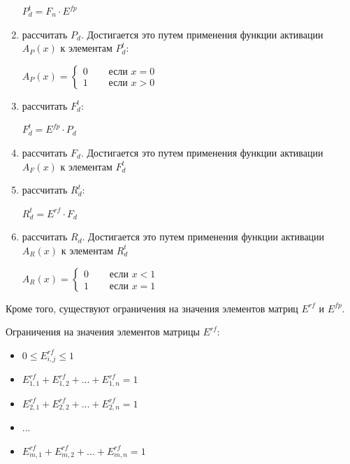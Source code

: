 \documentclass{article}
\begin{document}
\begin{enumerate}
    \begin{center}
      $P^{t}_{d} = F_{n} \cdot E^{fp}$
    \end{center}

    \item рассчитать $P_{d}$. Достигается это путем применения функции активации $A_{P}(x)$ к элементам $P^{t}_{d}$:

    \begin{center}
      $
      A_{P}(x) =
        \begin{cases}
          0 & \quad \text{ если } x = 0 \\
          1 & \quad \text{ если } x > 0
        \end{cases}
      $
    \end{center}

    \item рассчитать $F^{t}_{d}$:

    \begin{center}
      $F^{t}_{d} = E^{fp} \cdot P_{d}$
    \end{center}

    \item рассчитать $F_{d}$. Достигается это путем применения функции активации $A_{F}(x)$ к элементам $F^{t}_{d}$

    \item рассчитать $R^{t}_{d}$:

    \begin{center}
      $R^{t}_{d} = E^{rf} \cdot F_{d}$
    \end{center}

    \item рассчитать $R_{d}$. Достигается это путем применения функции активации $A_{R}(x)$ к элементам $R^{t}_{d}$

    \begin{center}
      $
      A_{R}(x) =
        \begin{cases}
          0 & \quad \text{ если } x < 1 \\
          1 & \quad \text{ если } x = 1
        \end{cases}
      $
    \end{center}

  \end{enumerate}

  Кроме того, существуют ограничения на значения элементов матриц $E^{rf}$ и $E^{fp}$.

  Ограничения на значения элементов матрицы $E^{rf}$:
  \begin{itemize}
    \item[] $0 \leq E^{rf}_{i, j} \leq 1$
    \item[] $E^{rf}_{1, 1} + E^{rf}_{1, 2} + ... + E^{rf}_{1, n} = 1$
    \item[] $E^{rf}_{2, 1} + E^{rf}_{2, 2} + ... + E^{rf}_{2, n} = 1$
    \item[] ...
    \item[] $E^{rf}_{m, 1} + E^{rf}_{m, 2} + ... + E^{rf}_{m, n} = 1$
  \end{itemize}
\end{document}
